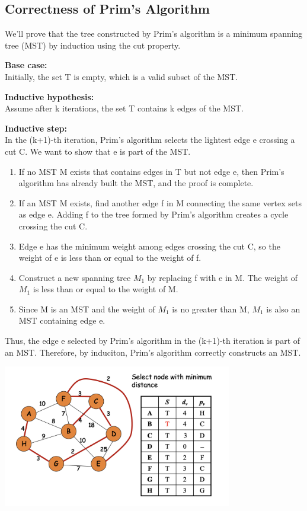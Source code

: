 \documentclass[12pt]{article}
\newcommand{\1}{\space \quad}
\newcommand{\2}{\quad \quad \quad}
\newcommand{\3}{\quad \quad \quad \quad \space}
\newcommand{\4}{\quad \quad \quad \quad \quad \quad}
\newcommand{\5}{\quad \quad \quad \quad \quad \quad \quad \space}
\begin{document}
\subsection{Correctness of Prim's Algorithm}
We'll prove that the tree constructed by Prim's algorithm is a minimum spanning tree (MST) by induction 
using the cut property.

\vspace{10pt}
\textbf{Base case:}\\
Initially, the set T is empty, which is a valid subset of the MST.

\vspace{10pt}
\textbf{Inductive hypothesis:} \\
Assume after k iterations, the set T contains k edges of the MST.

\vspace{10pt}
\textbf{Inductive step: } \\
In the (k+1)-th iteration, Prim's algorithm selects the lightest edge e crossing a cut C. We want to show that 
e is part of the MST.
\begin{enumerate}
\item If no MST M exists that contains edges in T but not edge e, then Prim's algorithm has already built the 
MST, and the proof is complete.
\item If an MST M exists, find another edge f in M connecting the same vertex sets as edge e. Adding f to the 
tree formed by Prim's algorithm creates a cycle crossing the cut C.
\item Edge e has the minimum weight among edges crossing the cut C, so the weight of e is less than or equal 
to the weight of f.
\item Construct a new spanning tree $M_1$ by replacing f with e in M. The weight of $M_1$ is less than or equal 
to the weight of M.
\item Since M is an MST and the weight of $M_1$ is no greater than M, $M_1$ is also an MST containing edge e.
\end{enumerate}
Thus, the edge e selected by Prim's algorithm in the (k+1)-th iteration is part of an MST. 
Therefore, by induciton, Prim's algorithm correctly constructs an MST.
\begin{center}
  \includegraphics[width=0.75\textwidth]{image24.png}
\end{center}
\end{document}

